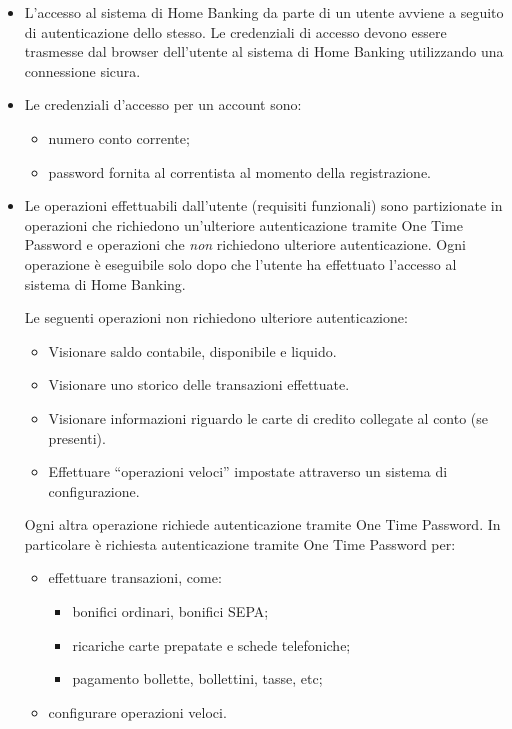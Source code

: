 \begin{itemize}
	\item L'accesso al sistema di Home Banking da parte di un utente avviene a seguito di autenticazione dello stesso.
		Le credenziali di accesso devono essere trasmesse dal browser dell'utente al sistema di Home Banking utilizzando una connessione sicura.
	\item Le credenziali d'accesso per un account sono:
		\begin{itemize}
			\item numero conto corrente;
			\item password fornita al correntista al momento della registrazione.
		\end{itemize}
	\item Le operazioni effettuabili dall'utente (requisiti funzionali) sono partizionate in operazioni che richiedono un'ulteriore autenticazione tramite One Time Password e operazioni che \emph{non} richiedono ulteriore autenticazione.
	Ogni operazione \`e eseguibile solo dopo che l'utente ha effettuato l'accesso al sistema di Home Banking.

	Le seguenti operazioni non richiedono ulteriore autenticazione:
	\begin{itemize}
		\item Visionare saldo contabile, disponibile e liquido.
		\item Visionare uno storico delle transazioni effettuate.
		\item Visionare informazioni riguardo le carte di credito collegate al conto (se presenti).
		\item Effettuare ``operazioni veloci'' impostate attraverso un sistema di configurazione.
	\end{itemize}
	
	Ogni altra operazione richiede autenticazione tramite One Time Password.
	In particolare \`e richiesta autenticazione tramite One Time Password per:
	\begin{itemize}
		\item effettuare transazioni, come:
		\begin{itemize}
			\item bonifici ordinari, bonifici SEPA;
			\item ricariche carte prepatate e schede telefoniche;
			\item pagamento bollette, bollettini, tasse, etc;
		\end{itemize}
		\item configurare operazioni veloci.
	\end{itemize}
\end{itemize}


